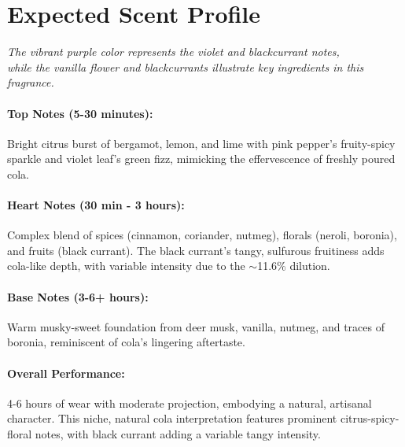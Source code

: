 \documentclass{article}
\begin{document}
\section*{Expected Scent Profile}

\begin{center}
\textit{\small The vibrant purple color represents the violet and blackcurrant notes,\\
while the vanilla flower and blackcurrants illustrate key ingredients in this fragrance.}
\end{center}
\vspace{0.3cm}

\paragraph{\textcolor{colaRed}{\textbf{Top Notes (5-30 minutes):}}}
Bright citrus burst of bergamot, lemon, and lime with pink pepper's fruity-spicy sparkle and violet leaf's green fizz, mimicking the effervescence of freshly poured cola.

\paragraph{\textcolor{colaBrown}{\textbf{Heart Notes (30 min - 3 hours):}}}
Complex blend of spices (cinnamon, coriander, nutmeg), florals (neroli, boronia), and fruits (black currant). The black currant's tangy, sulfurous fruitiness adds cola-like depth, with variable intensity due to the $\sim$11.6\% dilution.

\paragraph{\textcolor{colaDark}{\textbf{Base Notes (3-6+ hours):}}}
Warm musky-sweet foundation from deer musk, vanilla, nutmeg, and traces of boronia, reminiscent of cola's lingering aftertaste.

\paragraph{\textcolor{violetPurple}{\textbf{Overall Performance:}}}
4-6 hours of wear with moderate projection, embodying a natural, artisanal character. This niche, natural cola interpretation features prominent citrus-spicy-floral notes, with black currant adding a variable tangy intensity.
\end{document}
